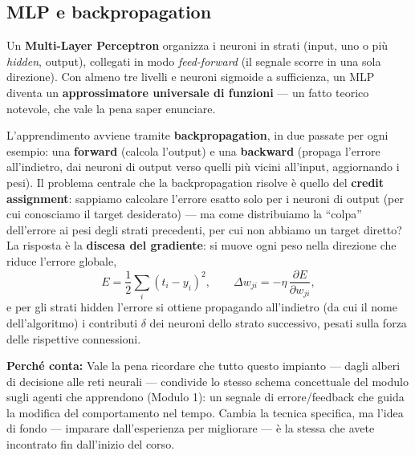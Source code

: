\documentclass[11pt,a4paper]{article}
\newcommand{\perche}[1]{\begin{nota}\textbf{Perché conta:} #1\end{nota}}
\begin{document}
\subsection{MLP e backpropagation}

Un \textbf{Multi-Layer Perceptron} organizza i neuroni in strati (input, uno o più \emph{hidden}, output), collegati in modo \emph{feed-forward} (il segnale scorre in una sola direzione). Con almeno tre livelli e neuroni sigmoide a sufficienza, un MLP diventa un \textbf{approssimatore universale di funzioni} --- un fatto teorico notevole, che vale la pena saper enunciare.

L'apprendimento avviene tramite \textbf{backpropagation}, in due passate per ogni esempio: una \textbf{forward} (calcola l'output) e una \textbf{backward} (propaga l'errore all'indietro, dai neuroni di output verso quelli più vicini all'input, aggiornando i pesi). Il problema centrale che la backpropagation risolve è quello del \textbf{credit assignment}: sappiamo calcolare l'errore esatto solo per i neuroni di output (per cui conosciamo il target desiderato) --- ma come distribuiamo la ``colpa'' dell'errore ai pesi degli strati precedenti, per cui non abbiamo un target diretto? La risposta è la \textbf{discesa del gradiente}: si muove ogni peso nella direzione che riduce l'errore globale,
\[
E = \frac12 \sum_i (t_i - y_i)^2, \qquad \Delta w_{ji} = -\eta\,\frac{\partial E}{\partial w_{ji}},
\]
e per gli strati hidden l'errore si ottiene propagando all'indietro (da cui il nome dell'algoritmo) i contributi $\delta$ dei neuroni dello strato successivo, pesati sulla forza delle rispettive connessioni.

\perche{Vale la pena ricordare che tutto questo impianto --- dagli alberi di decisione alle reti neurali --- condivide lo stesso schema concettuale del modulo sugli agenti che apprendono (Modulo 1): un segnale di errore/feedback che guida la modifica del comportamento nel tempo. Cambia la tecnica specifica, ma l'idea di fondo --- imparare dall'esperienza per migliorare --- è la stessa che avete incontrato fin dall'inizio del corso.}
\end{document}
